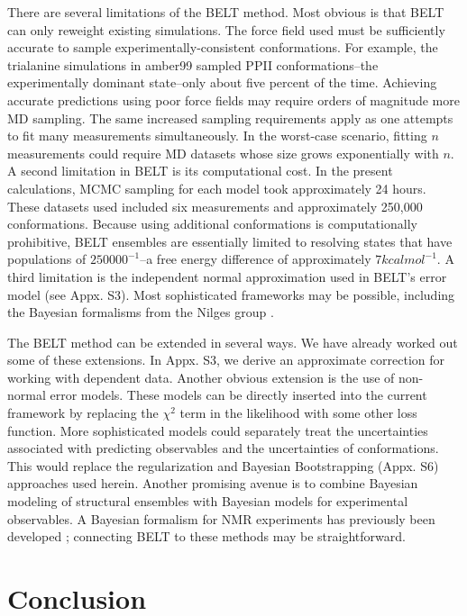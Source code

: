 \documentclass[11pt,titlepage]{article}
\begin{document}
There are several limitations of the BELT method.  Most obvious is that BELT can only reweight existing simulations.  The force field used must be sufficiently accurate to sample experimentally-consistent conformations.  For example, the trialanine simulations in amber99 sampled PPII conformations--the experimentally dominant state--only about five percent of the time.  Achieving accurate predictions using poor force fields may require orders of magnitude more MD sampling.  The same increased sampling requirements apply as one attempts to fit many measurements simultaneously.  In the worst-case scenario, fitting $n$ measurements could require MD datasets whose size grows exponentially with $n$.  A second limitation in BELT is its computational cost.  In the present calculations, MCMC sampling for each model took approximately 24 hours.  These datasets used included six measurements and approximately 250,000 conformations.  Because using additional conformations is computationally prohibitive, BELT ensembles are essentially limited to resolving states that have populations of $250000^{-1}$--a free energy difference of approximately $7 kcal mol^{-1}$.  A third limitation is the independent normal approximation used in BELT's error model (see Appx. S3).  Most sophisticated frameworks may be possible, including the Bayesian formalisms from the Nilges group \citep{rieping2005, habeck2006, habeck2005bayesian}.  


The BELT method can be extended in several ways.  We have already worked out some of these extensions.  In Appx. S3, we derive an approximate correction for working with dependent data.  Another obvious extension is the use of non-normal error models.  These models can be directly inserted into the current framework by replacing the $\chi^2$ term in the likelihood with some other loss function.  More sophisticated models could separately treat the uncertainties associated with predicting observables and the uncertainties of conformations.  This would replace the regularization and Bayesian Bootstrapping (Appx. S6) approaches used herein.  Another promising avenue is to combine Bayesian modeling of structural ensembles with Bayesian models for experimental observables.  A Bayesian formalism for NMR experiments has previously been developed  \citep{rieping2005, habeck2006, habeck2005bayesian}; connecting BELT to these methods may be straightforward.  


\section*{Conclusion}
\end{document}
